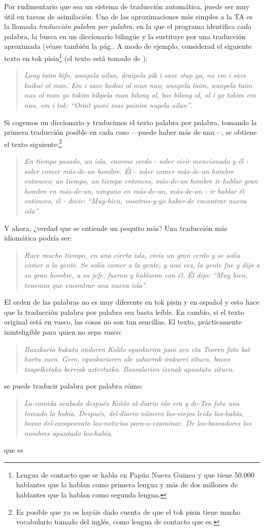 Por rudimentario que sea un sistema de traducción automática, puede ser muy útil en tareas de asimilación. Una de las aproximaciones más simples a la TA es la llamada \emph{traducción palabra por palabra}, en la que el programa identifica cada palabra, la busca en un diccionario bilingüe y la sustituye por una traducción aproximada (véase también la pág.\pageref{pg:mpm}. A modo de ejemplo, considerad el siguiente texto en tok pisin\footnote{Lengua de contacto que se habla en Papúa Nueva Guinea y que tiene 50.000 hablantes que la hablan como primera lengua y más de dos millones de hablantes que la hablan como segunda lengua.} (el texto está tomado de \citealt{lyovin97b}): \begin{quote}{\sl Long taim bifo, wanpela ailan, draipela pik i save stap ya, na em i save kaikai ol man. Em i save kaikai ol man nau; wanpela taim, wanpela taim nau ol man go tokim bikpela man bilong ol, bos bilong ol, ol i go tokim em nau, em i tok: ``Orait yumi mas painim nupela ailan''. } \end{quote} Si cogemos un diccionario y traducimos el texto palabra por palabra, tomando la primera traducción posible en cada caso ---puede haber más de una---, se obtiene el texto siguiente:\footnote{Es posible que ya os hayáis dado cuenta de que el tok pisin tiene mucho vocabulario tomado del inglés, como lengua de contacto que es.} \begin{quote}{\sl En tiempo pasado, un isla, enorme cerdo - soler vivir mencionado y él - soler comer más-de-un hombre. Él - soler comer más-de-un hombre entonces; un tiempo, un tiempo entonces, más-de-un hombre ir hablar gran hombre en más-de-un, ninguno en más-de-un, más-de-un - ir hablar él entonces, él - decir: ``Muy-bien, vosotros-y-yo haber-de encontrar nueva isla''.} \end{quote} Y ahora, ¿verdad que se entiende un poquito más? Una traducción más idiomática podría ser: \begin{quote}{\sl Hace mucho tiempo, en una cierta isla, vivía un gran cerdo y se solía comer a la gente. Se solía comer a la gente, y una vez, la gente fue y dijo a su gran hombre, a su jefe, fueron y hablaron con él. Él dijo: ``Muy bien, tenemos que encontrar una nueva isla''.} \end{quote} El orden de las palabras no es muy diferente en tok pisin y en español y esto hace que la traducción palabra por palabra sea basta leíble. En cambio, si el texto original está en vasco, las cosas no son tan sencillas. El texto, prácticamente ininteligible para quien no sepa vasco: \begin{quote}{\sl Baazkaria bukatu ondoren Koldo egunkarira joan zen eta Teoren foto bat hartu zuen. Gero, egunkariaren ale zaharrak irakurri zituen, boxeo txapelketako berriak aztertzeko. Boxealarien izenak apuntatu zituen.} \end{quote} se puede traducir palabra por palabra cómo: \begin{quote}{\sl La-comida acabada después Koldo al-diario ido era y de-Teo foto una tomado lo había. Después, del-diario número los-viejos leído los-había, boxeo del-campeonato las-noticias para-a-examinar. De los-boxeadores los nombres apuntado los-había.} \end{quote} que es 